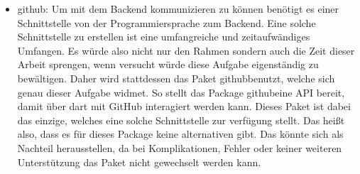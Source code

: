 \begin{itemize}
	\item github\cite{tech_packageGithub}: Um mit dem Backend kommunizieren zu können benötigt es einer Schnittstelle von der Programmiersprache zum Backend. Eine solche Schnittstelle zu erstellen ist eine umfangreiche und zeitaufwändiges Umfangen. Es würde also nicht nur den Rahmen sondern auch die Zeit dieser Arbeit sprengen, wenn versucht würde diese Aufgabe eigenständig zu bewältigen. Daher wird stattdessen das Paket \glqq github\grqq benutzt, welche sich genau dieser Aufgabe widmet. 
		So stellt das Package \dq github\dq eine API bereit, damit über dart mit GitHub interagiert werden kann. 
		Dieses Paket ist dabei das einzige, welches eine solche Schnittstelle zur verfügung stellt. Das heißt also, dass es für dieses Package keine alternativen gibt. Das könnte sich als Nachteil herausstellen, da bei Komplikationen, Fehler oder keiner weiteren Unterstützung das Paket nicht gewechselt werden kann. 

\end{itemize}
